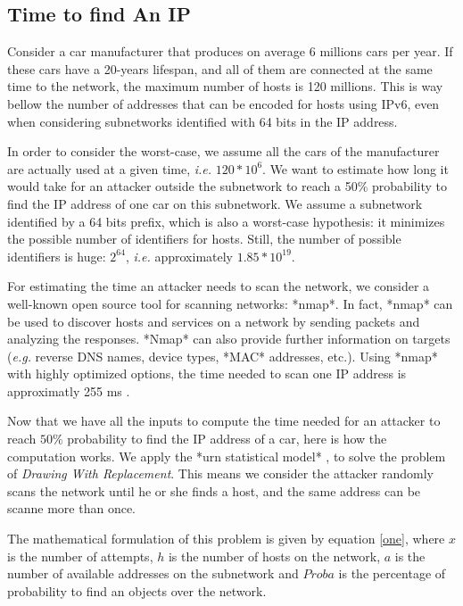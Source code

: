 \subsection {Time to find An IP}


\label{sec:soa}

Consider a car manufacturer that produces on average 6 millions cars
per year. If these cars have a 20-years lifespan, and all of them are
connected at the same time to the network, the maximum number of hosts
is 120 millions. This is way bellow the number of addresses that can
be encoded for hosts using IPv6, even when considering subnetworks
identified with 64 bits in the IP address.

In order to consider the worst-case, we assume all the cars of the
manufacturer are actually used at a given time, \emph{i.e.}
$120*10^6$. We want to estimate how long it would take for an attacker
outside the subnetwork to reach a 50\% probability to find the IP
address of one car on this subnetwork. We assume a subnetwork
identified by a 64 bits prefix, which is also a worst-case hypothesis:
it minimizes the possible number of identifiers for hosts. Still, the
number of possible identifiers is huge: $2^{64}$, \emph{i.e.}
approximately $1.85*10^{19}$.

For estimating the time an attacker needs to scan the network, we
consider a well-known open source tool for scanning networks: *nmap*. In
fact, *nmap* can be used to discover hosts and services on a network by
sending packets and analyzing the responses. *Nmap* can also provide
further information on targets (\emph{e.g.} reverse DNS names, device
types, *MAC* addresses, etc.). Using *nmap* with highly optimized options,
the time needed to scan one IP address is approximatly 255 ms
\cite{nmap_2009}. 

Now that we have all the inputs to compute the time needed for an
attacker to reach $50\%$ probability to find the IP address of
a car, here is how the computation works. We apply the *urn
statistical model* \cite{carroll_2014}, to solve the problem of \emph{Drawing
With Replacement}. This means we consider the attacker randomly scans
the network until he or she finds a host, and the same address can be
scanne more than once.

The mathematical formulation of this problem is given by equation
\eqref{one}, where $x$ is the number of attempts, $h$ is the
number of hosts on the network, $a$ is the number of available
addresses on the subnetwork and $Proba$ is the percentage of
probability to find an objects over the network.

